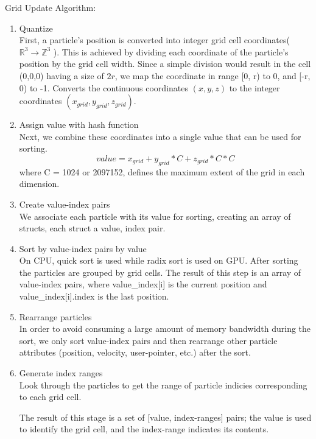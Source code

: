 \documentclass[]{article}
\begin{document}
			Grid Update Algorithm:
			\begin{enumerate}
				\item Quantize\\
				First, a particle's position is converted into integer grid cell coordinates( \( \mathbb{R}^{3} \to \mathbb{Z}^{3}\) ).
				This is achieved by dividing each coordinate of the particle's position by the grid cell width.
				Since a simple division would result in the cell (0,0,0) having a size of \(2r\), we map the coordinate 
				in range [0, r) to 0, and [-r, 0) to -1. Converts the continuous coordinates \((x, y, z)\) to the integer 
				coordinates \((x_{grid}, y_{grid}, z_{grid})\).
				
				\item Assign value with hash function\\
				Next, we combine these coordinates into a single value that can be used for sorting.
				\begin{equation}
					\label{eq_hash}
				value = x_{grid} + y_{grid} * C + z_{grid} * C * C
				\end{equation}
				where C = 1024 or 2097152, defines the maximum extent of the grid in each dimension.
				
				\item Create value-index pairs\\
				We associate each particle with its value for sorting, creating an array of structs, each struct a 
				{value, index} pair.
				
				\item Sort by value-index pairs by value\\
				On CPU, quick sort is used while radix sort is used on GPU. After sorting the particles are grouped by 
				grid cells. The result of this step is an array of value-index pairs, where value\_index[i] is the current 
				position and value\_index[i].index is the last position.
			
				\item Rearrange particles\\
				In order to avoid consuming a large amount of memory bandwidth during the sort, we only sort value-index 
				pairs and then rearrange other particle attributes (position, velocity, user-pointer, etc.) after the sort.
			
				\item Generate index ranges\\
				Look through the particles to get the range of particle indicies corresponding to each grid cell.
				
				The result of this stage is a set of [value, index-ranges] pairs; the value is used to identify
				the grid cell, and the index-range indicates its contents.
			\end{enumerate}
			
\end{document}
